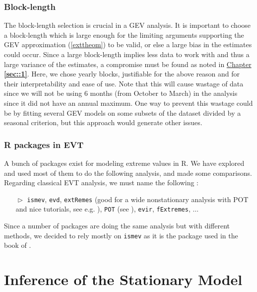 \subsubsection*{Block-length } 

The block-length selection is crucial in a GEV analysis. It is important to choose a block-length which is large enough for the limiting arguments supporting the GEV approximation (\ref{exttheom}) to be valid, or else a large bias in the estimates could occur. Since a large block-length implies less data to work with and thus a large variance of the estimates, a compromise must be found as noted in \hyperref[sec::1]{Chapter \textbf{\ref{sec::1}}}. Here, we chose yearly blocks, justifiable for the above reason and for their interpretability and ease of use.
Note that this will cause wastage of data since we will not be using 6 months (from October to March) in the analysis since it did not have an annual maximum. 
One way to prevent this wastage could be by fitting several GEV models on some subsets of the dataset divided by a seasonal criterion, but this approach would generate other issues. 



\subsubsection*{R packages in EVT}

A bunch of packages exist for modeling extreme values in R. We have explored and used most of them to do the following analysis, and made some comparisons. Regarding classical EVT analysis, we must name the following : 

\begin{itemize}
	\item[$\vartriangleright$] \texttt{ismev}, \texttt{evd}, \texttt{extRemes} (good for a wide nonstationary analysis with POT and nice tutorials, see e.g. \citet{gilleland_extremes_2016}), \texttt{POT} (see \citet{ribatet_users_2006}), \texttt{evir}, \texttt{fExtremes}, $\dots$
\end{itemize}
Since a number of packages are doing the same analysis but with different methods, we decided to rely mostly on \texttt{ismev} as it is the package used in the book of \citet{coles_introduction_2001}.

\section{Inference of the Stationary Model}\label{sec:xpstatio}

